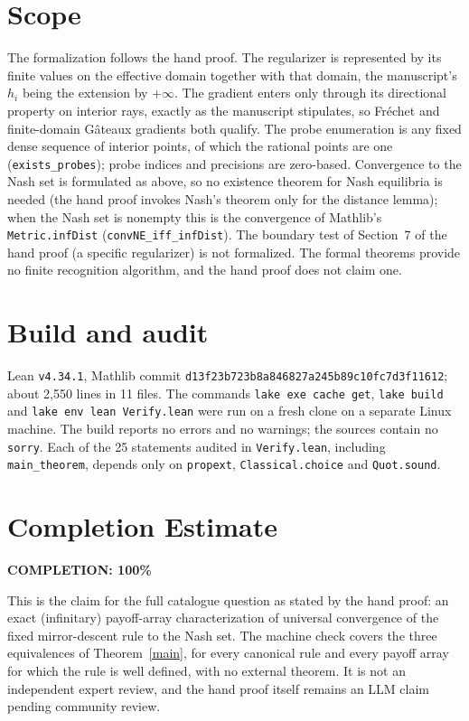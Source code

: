 \documentclass[11pt]{article}
\theoremstyle{definition}
\begin{document}
\section{Scope}

The formalization follows the hand proof. The regularizer is represented by its finite values on the effective domain together with that domain, the manuscript's $h_i$ being the extension by $+\infty$. The gradient enters only through its directional property on interior rays, exactly as the manuscript stipulates, so Fr\'echet and finite-domain G\^ateaux gradients both qualify. The probe enumeration is any fixed dense sequence of interior points, of which the rational points are one (\texttt{exists\_probes}); probe indices and precisions are zero-based. Convergence to the Nash set is formulated as above, so no existence theorem for Nash equilibria is needed (the hand proof invokes Nash's theorem only for the distance lemma); when the Nash set is nonempty this is the convergence of Mathlib's \texttt{Metric.infDist} (\texttt{convNE\_iff\_infDist}). The boundary test of Section~7 of the hand proof (a specific regularizer) is not formalized. The formal theorems provide no finite recognition algorithm, and the hand proof does not claim one.

\section{Build and audit}

Lean \texttt{v4.34.1}, Mathlib commit \texttt{d13f23b723b8a846827a245b89c10fc7d3f11612}; about 2,550 lines in 11 files. The commands \texttt{lake exe cache get}, \texttt{lake build} and \texttt{lake env lean Verify.lean} were run on a fresh clone on a separate Linux machine. The build reports no errors and no warnings; the sources contain no \texttt{sorry}. Each of the 25 statements audited in \texttt{Verify.lean}, including \texttt{main\_theorem}, depends only on \texttt{propext}, \texttt{Classical.choice} and \texttt{Quot.sound}.

\section{Completion Estimate}
\noindent\textbf{COMPLETION: 100\%}

This is the claim for the full catalogue question as stated by the hand proof: an exact (infinitary) payoff-array characterization of universal convergence of the fixed mirror-descent rule to the Nash set. The machine check covers the three equivalences of Theorem~\ref{main}, for every canonical rule and every payoff array for which the rule is well defined, with no external theorem. It is not an independent expert review, and the hand proof itself remains an LLM claim pending community review.
\end{document}
